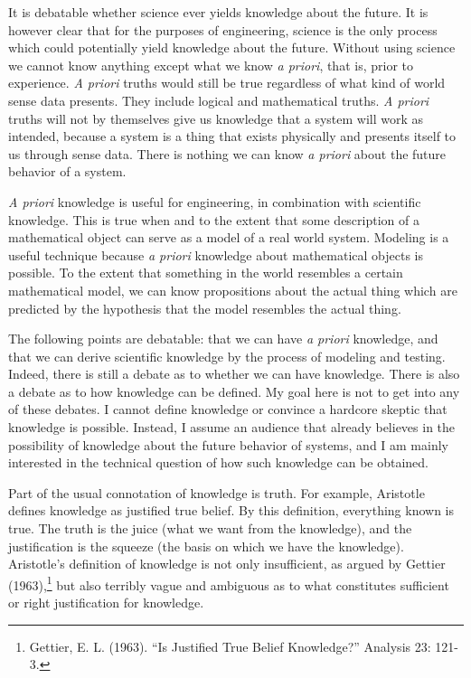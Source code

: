 \documentclass[11pt]{article}
\begin{document}
It is debatable whether science ever yields knowledge about the future. It is however clear
that for the purposes of engineering, science is the only process which could potentially
yield knowledge about the future. Without using science we cannot know anything except
what we know \emph{a priori}, that is, prior to experience. \emph{A priori}\/ truths would
still be true regardless of what kind of world sense data presents. They include logical
and mathematical truths. \emph{A priori}\/ truths will not by themselves give us knowledge
that a system will work as intended, because a system is a thing that exists physically and
presents itself to us through sense data. There is nothing we can know \emph{a priori}\/
about the future behavior of a system.

\emph{A priori}\/ knowledge is useful for engineering, in combination with scientific
knowledge. This is true when and to the extent that some description of a mathematical object
can serve as a model of a real world system. Modeling is a useful technique because
\emph{a priori}\/ knowledge about mathematical objects is possible. To the extent
that something in the world resembles a certain mathematical model, we can know propositions
about the actual thing which are predicted by the hypothesis that the model resembles
the actual thing.

The following points are debatable: that we can have
\emph{a priori}\/ knowledge, and that we can derive scientific knowledge by the process
of modeling and testing. Indeed, there is still a debate as to whether we can have knowledge.
There is also a debate as to how knowledge can be defined. My goal here is not to get
into any of these debates. I cannot define knowledge or convince a hardcore skeptic
that knowledge is possible. Instead, I assume an audience that already believes in the
possibility of knowledge about the future behavior of systems, and I am mainly interested in
the technical question of how such knowledge can be obtained.

Part of the usual connotation of knowledge is truth. For example, Aristotle defines knowledge
as justified true belief. By this definition, everything known is true. The truth is the
juice (what we want from the knowledge), and the justification is the squeeze (the basis
on which we have the knowledge). Aristotle's definition of knowledge is not only
insufficient, as argued by Gettier (1963),\footnote{Gettier, E. L. (1963).
``Is Justified True Belief Knowledge?'' Analysis 23: 121-3.}
but also terribly vague and ambiguous as to what constitutes sufficient or
right justification for knowledge.
\end{document}
